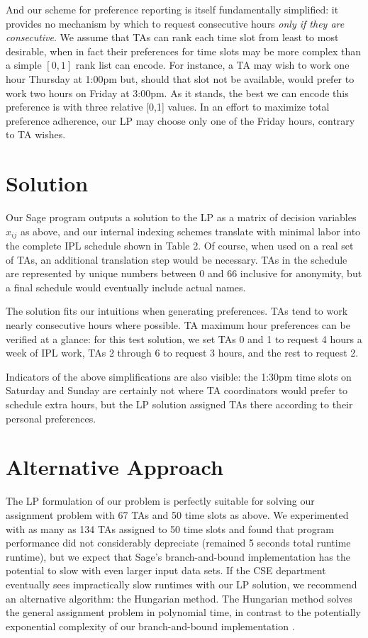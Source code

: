 \documentclass{article}
\begin{document}
\begin{multicols}{2}
And our scheme for preference reporting is itself fundamentally simplified: it provides no mechanism by which to request consecutive hours \textit{only if they are consecutive}. We assume that TAs can rank each time slot from least to most desirable, when in fact their preferences for time slots may be more complex than a simple $[0, 1]$ rank list can encode. For instance, a TA may wish to work one hour Thursday at 1:00pm but, should that slot not be available, would prefer to work two hours on Friday at 3:00pm. As it stands, the best we can encode this preference is with three relative [0,1] values. In an effort to maximize total preference adherence, our LP may choose only one of the Friday hours, contrary to TA wishes.

\section*{Solution}

Our Sage program outputs a solution to the LP as a matrix of decision variables $x_{ij}$ as above, and our internal indexing schemes translate with minimal labor into the complete IPL schedule shown in Table 2. Of course, when used on a real set of TAs, an additional translation step would be necessary. TAs in the schedule are represented by unique numbers between 0 and 66 inclusive for anonymity, but a final schedule would eventually include actual names.

The solution fits our intuitions when generating preferences. TAs tend to work nearly consecutive hours where possible. TA maximum hour preferences can be verified at a glance: for this test solution, we set TAs 0 and 1 to request 4 hours a week of IPL work, TAs 2 through 6 to request 3 hours, and the rest to request 2.

Indicators of the above simplifications are also visible: the 1:30pm time slots on Saturday and Sunday are certainly not where TA coordinators would prefer to schedule extra hours, but the LP solution assigned TAs there according to their personal preferences.

\section*{Alternative Approach}

The LP formulation of our problem is perfectly suitable for solving our assignment problem with 67 TAs and 50 time slots as above. We experimented with as many as 134 TAs assigned to 50 time slots and found that program performance did not considerably depreciate (remained 5 seconds total runtime runtime), but we expect that Sage's branch-and-bound implementation has the potential to slow with even larger input data sets. If the CSE department eventually sees impractically slow runtimes with our LP solution, we recommend an alternative algorithm: the Hungarian method. The Hungarian method solves the general assignment problem in polynomial time, in contrast to the potentially exponential complexity of our branch-and-bound implementation \cite{wiki}.


\end{multicols}
\end{document}
